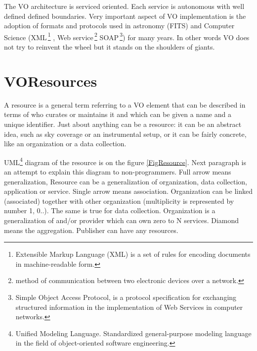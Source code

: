 \clearpage

The VO architecture is serviced oriented. Each service is autonomous
with well defined defined boundaries. Very important aspect of VO
implementation is the adoption of formats and protocols used in
astronomy (FITS) and Computer Science (XML\,\footnote{Extensible
  Markup Language (XML) is a set of rules for encoding documents in
  machine-readable form.} , Web service\,\footnote{method of
  communication between two electronic devices over a network.} SOAP\,\footnote{Simple Object Access Protocol, is a protocol specification
  for exchanging structured information in the implementation of Web
  Services in computer networks.}) for many years. In other words VO
does not try to reinvent the wheel but it stands on the shoulders of
giants.


\section{VOResources}

A resource is a general term referring to a VO element that can be
described in terms of who curates or maintains it and which can be
given a name and a unique identifier. Just about anything can be a
resource: it can be an abstract idea, such as sky coverage or an
instrumental setup, or it can be fairly concrete, like an organization
or a data collection. \cite{bensonivoa}

UML\footnote{Unified Modeling Language. Standardized general-purpose
  modeling language in the field of object-oriented software
  engineering.}  diagram of the resource is on the figure
\ref{FigResource}. Next paragraph is an attempt to explain this
diagram to non-programmers. Full arrow means generalization, Resource
can be a generalization of organization, data collection, application
or service. Single arrow means association. Organization can be linked
(associated) together with other organization (multiplicity is
represented by number 1, 0..). The same is true for data
collection. Organization is a generalization of and/or provider which
can own zero to N services. Diamond means the aggregation. Publisher
can have any resources.
  
